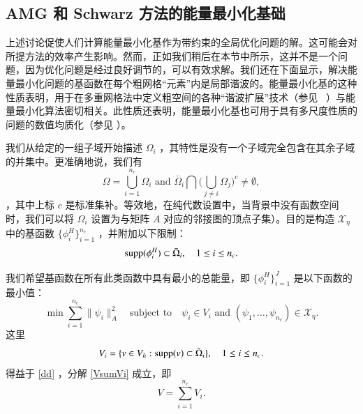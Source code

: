 \documentclass[12pt]{acta_2011xz}
\begin{document}
   \subsection{AMG 和 Schwarz 方法的能量最小化基础  }       \label{s:energymin-2}    上述讨论促使人们计算能量最小化基作为带约束的全局优化问题的解。这可能会对所提方法的效率产生影响。然而，正如我们稍后在本节中所示，这并不是一个问题，因为优化问题是经过良好调节的，可以有效求解。我们还在下面显示，解决能量最小化问题的基函数在每个粗网格“元素”内是局部谐波的。能量最小化基的这种性质表明，用于在多重网格法中定义粗空间的各种“谐波扩展”技术（参见~    \cite{chan1998agglomeration,Brezina.M;Cleary.A;Falgout.R;Henson.V;Jones.J;Manteuffel.T;McCormick.S;Ruge.J.2001a,Jones.J;Vassilevski.P.2001a}    ）与能量最小化算法密切相关。此性质还表明，能量最小化基也可用于具有多尺度性质的问题的数值均质化（参见    \cite{efendiev2000convergence,hou1999convergence}    ）。  

我们从给定的一组子域开始描述 
   $\Omega_i$    ，其特性是没有一个子域完全包含在其余子域的并集中。更准确地说，我们有
   \begin{equation}\label{dd}
    \Omega=\bigcup_{i=1}^{n_c}\Omega_i\mbox{ and }
\bar\Omega_i\bigcap\bigg(\bigcup_{j\neq i}\Omega_j\bigg)^c\neq\emptyset,
\end{equation}    ，其中上标    $c$    是标准集补。等效地，在纯代数设置中，当背景中没有函数空间时，我们可以将    $\Omega_i$    设置为与矩阵    $A$    对应的邻接图的顶点子集）。目的是构造    $\mathcal X_\eta$    中的基函数    $ \{ \phi_i^H \} _{i=1}^{n_c}$    ，并附加以下限制：
   $$
{\rm supp}(\phi_i^H)\subset\bar\Omega_i, \quad 1\le i\le n_c.
$$     

我们希望基函数在所有此类函数中具有最小的总能量，即    $ \{ \phi_i^H \} _{i=1}^{J}$    是以下函数的最小值：
   \begin{equation}\label{min}
    \min \sum_{i=1}^{n_c}\|\psi_i\|_A^2 \quad
    \mbox{subject to}\quad \psi_i\in V_i \text{ and } (\psi_1, \dots,
    \psi_{n_c})\in \mathcal X_\eta. 
\end{equation}    这里 
   \begin{equation}
  \label{vj}
V_i= \{ v\in V_h: {\rm supp}(v)\subset \bar\Omega_i \} , \quad 1\le i \le n_c.
\end{equation}    得益于    \eqref{dd}    ，分解    \eqref{VsumVi}    成立，即
   \begin{equation}\label{VsumVi}
    V=\sum_{i=1}^{n_c}V_i.  
\end{equation}     
\end{document}
